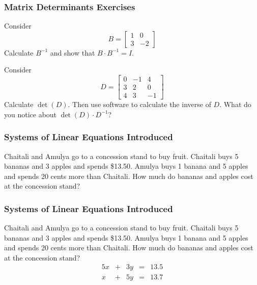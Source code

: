 \documentclass[xcolor=dvipsnames]{beamer}
\begin{document}
\begin{frame}
  \frametitle{Matrix Determinants Exercises}  
  {\ubung} Consider
  \begin{equation}
    \label{eq:aengixoh}
    B=\left[
      \begin{array}{cc}
        1 & 0 \\
        3 & -2 
      \end{array}\right]
  \end{equation}
  Calculate $B^{-1}$ and show that $B\cdot{}B^{-1}=I$.

  \medskip

  {\ubung} Consider
  \begin{equation}
    \label{eq:eecheipo}
    D=\left[
      \begin{array}{ccc}
        0 & -1 & 4 \\
        3 & 2 & 0 \\
        4 & 3 & -1 
      \end{array}\right]
  \end{equation}
Calculate $\det(D)$. Then use software to calculate the inverse of
$D$. What do you notice about $\det(D)\cdot{}D^{-1}$?
\end{frame}

\begin{frame}
  \frametitle{Systems of Linear Equations Introduced}
  Chaitali and Amulya go to a concession stand to buy fruit. Chaitali
  buys 5 bananas and 3 apples and spends \$13.50. Amulya buys 1 banana
  and 5 apples and spends 20 cents more than Chaitali. How much do
  bananas and apples cost at the concession stand?
\end{frame}

\begin{frame}
  \frametitle{Systems of Linear Equations Introduced}
  Chaitali and Amulya go to a concession stand to buy fruit. Chaitali
  buys 5 bananas and 3 apples and spends \$13.50. Amulya buys 1 banana
  and 5 apples and spends 20 cents more than Chaitali. How much do
  bananas and apples cost at the concession stand?
  \begin{equation}
    \label{eq:mohloogh}
    \begin{array}{rcrcl}
      5x&+&3y&=&13.5 \\
      x&+&5y&=&13.7
    \end{array}
  \end{equation}
\end{frame}
\end{document}
